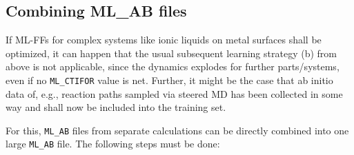 \documentclass[a4paper,11pt]{article}
\begin{document}
\subsection{Combining ML\_AB files}

If ML-FFs for complex systems like ionic liquids on metal surfaces shall be optimized, it can happen that the usual subsequent 
learning strategy (b) from above is not applicable, since the dynamics explodes for further parts/systems, even if no
\texttt{ML\_CTIFOR} value is net.
Further, it might be the case that ab initio data of, e.g., reaction paths sampled via steered MD has been collected in some 
way and shall now be included into the training set.

For this, \texttt{ML\_AB} files from separate calculations can be directly combined into one large \texttt{ML\_AB} file.
The following steps must be done:
\end{document}
